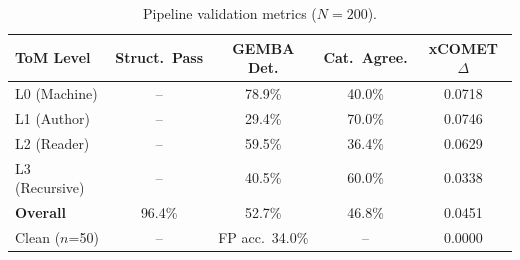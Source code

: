 \begin{table}[t]
  \centering
  \caption{Pipeline validation metrics ($N{=}200$).}
  \label{tab:pipeline-validation}
  \small
  \begin{tabular}{l c c c c}
    \toprule
    \textbf{ToM Level} & \textbf{Struct.\ Pass} & \textbf{GEMBA Det.} & \textbf{Cat.\ Agree.} & \textbf{xCOMET $\Delta$} \\
    \midrule
    L0 (Machine) & -- & 78.9\% & 40.0\% & 0.0718 \\
    L1 (Author) & -- & 29.4\% & 70.0\% & 0.0746 \\
    L2 (Reader) & -- & 59.5\% & 36.4\% & 0.0629 \\
    L3 (Recursive) & -- & 40.5\% & 60.0\% & 0.0338 \\
    \midrule
    \textbf{Overall} & 96.4\% & 52.7\% & 46.8\% & 0.0451 \\
    Clean ($n$=50) & -- & FP acc.\ 34.0\% & -- & 0.0000 \\
    \bottomrule
  \end{tabular}
\end{table}